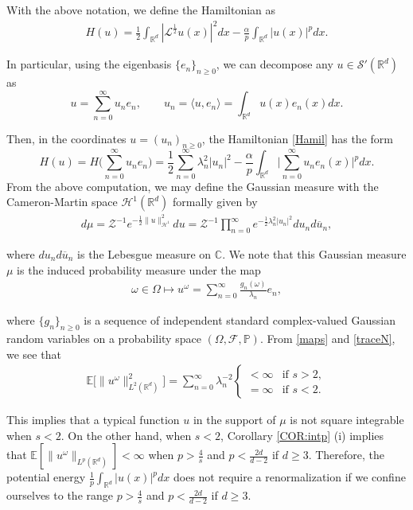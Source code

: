 \documentclass[%
11pt,  reqno]{amsart}
\theoremstyle{remarkstyle}
\newcommand{\1}{\hspace{0.2mm}\text{I}\hspace{0.2mm}}
\newcommand{\noi}{\noindent}
\newcommand{\R}{\mathbb{R}}
\newcommand{\E}{\mathbb{E}}
\renewcommand{\L}{\mathcal{L}}
\newcommand{\F}{\mathcal{F}}
\newcommand{\al}{\alpha}
\newcommand{\ld}{\lambda}
\newcommand{\cj}{\overline}
\renewcommand{\o}{\omega}
\renewcommand{\O}{\Omega}
\renewcommand{\S}{\mathcal{S}}
\newcommand{\PP}{\mathbb{P}}
\numberwithin{equation}{section}
\numberwithin{theorem}{section}
\begin{document}
	
	With the above notation, we define the Hamiltonian as
	\begin{align} \label{Hamil}
		H(u)  = \frac12 \int_{\R^d} |\L^{\frac12} u(x) |^2 dx - \frac{\al}p \int_{\R^d} |u(x)|^p dx .
	\end{align}
	
	\noi
	In particular, using the eigenbasis $\{e_n\}_{n\ge 0}$, we can decompose any $u\in\S'(\R^d)$ as 
	$$u = \sum_{n= 0}^\infty u_n e_n, \qquad u_n=\langle u, e_n\rangle = \int_{\R^d} u(x)e_n(x)dx.$$
	
	\noi
	Then, in the coordinates $u = (u_n)_{n\geq 0}$, the Hamiltonian \eqref{Hamil} has the form
	\[
	H(u) = H \Big(\sum_{n=0}^\infty u_n e_n \Big) = \frac12 \sum_{n=0}^\infty \lambda_n^2 |u_n|^2
	- \frac{\al}p \int_{\R^d} \Big| \sum_{n=0}^\infty u_n e_n(x) \Big|^p dx.
	\]
	From the above computation,
	we may define the Gaussian measure with the Cameron-Martin space $\mathcal H^1(\R^d)$ formally given by
	\begin{align}
		d\mu = \mathcal Z^{-1} e^{-\frac12 \|u\|_{\mathcal H^1}^2} du = \mathcal Z^{-1} \prod_{n=0}^\infty e^{-\frac12 \ld^2_n |u_n|^2} d u_n d \cj u_n,
		\label{Gaussian}
	\end{align}
	
	\noi
	where $du_n d \cj u_n$ is the Lebesgue measure on $\mathbb C$.
	We note that this Gaussian measure $\mu$ is the induced probability measure under the map
	\begin{align}
		\label{maps}
		\o \in \O \longmapsto u^\o = \sum_{n= 0}^\infty \frac{g_n (\o)}{\ld_n} e_n,
	\end{align}
	
	\noi
	where $\{g_n\}_{n \ge 0}$ is a sequence of independent standard complex-valued Gaussian random variables on a probability space $(\O, \F, \PP)$.
	From \eqref{maps} and \eqref{traceN}, we see that
	\begin{align} \label{L2}
		\E \big[\| u^\o\|^2_{L^2 (\R^d)} \big] = \sum_{n=0}^\infty \ld_n^{-2}  \begin{cases}
			<\infty &\text{if } s>2, \\
			= \infty &\text{if } s < 2.
		\end{cases} 
	\end{align}
	
	\noi
	This implies that a typical function $u$ in the support of $\mu$ is not square integrable when $s < 2$.
	On the other hand, when $s < 2$, Corollary \ref{COR:intp} (i)
	implies that
	$\E [\|u^\o\|_{L^p (\R^d)}] < \infty$ when $p > \frac{4}s$ and $p<\frac{2d}{d-2}$ if $d\ge 3$. 
	Therefore, the potential energy $\frac{1}{p} \int_{\R^d} |u(x)|^p dx$ does not require a renormalization if we confine ourselves to the range $p > \frac4s$ and $p<\frac{2d}{d-2}$ if $d\ge 3$. 
	
\end{document}
